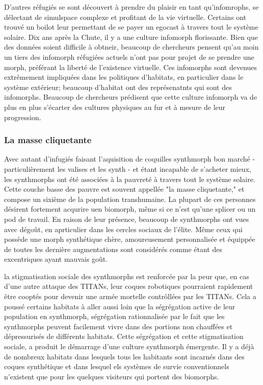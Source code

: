                D'autres réfugiés se sont découvert à prendre du plaisir en tant qu'infomrophs, se délectant de simulspace complexe et profitant de la vie virtuelle. Certains ont trouvé un boilot leur permettant de se payer un egocast à travers tout le système solaire. Dix ans après la Chute, il y a une culture infomorph florissante. Bien que des données soient difficile à obtneir, beaucoup de chercheurs pensent qu'au moin un tiers des infomorph réfugiées actuels n'ont pas pour projet de se prendre une morph, préférant la liberté de l'existence virtuelle. Ces infomorphs sont devenues extrêmement impliquées dans les politiques d'habitats, en particulier dans le système extérieur; beaucoup d'habitat ont des représenatnts qui sont des infomorphs. Beaucoup de chercheurs prédisent que cette culture infomorph va de plus en plus s'écarter des cultures physiques au fur et à mesure de leur progression. 

               \subsubsection{La masse cliquetante} \label{sec:clanking-masses} 

               Avec autant d'infugiés faisant l'aquisition de coquilles synthmorph bon marché - particulièrement les valises et les synth - et étant incapable de s'acheter mieux, les synthmorphs ont été associées à la pauvreté à travers tout le système solaire. Cette couche basse des pauvre est souvent appellée "la masse cliquetante," et compose un sixième de la population transhumaine. La plupart de ces personnes désirent fortement acqurire uen biomorph, même si ce n'est qu'une splicer ou un pod de travail. En raison de leur présence, beaucoup de synthmorphs ont vues avec dégoût, en aprticulier dans les cercles sociaux de l'élite. Même ceux qui possède une morph synthétique chère, amoureusement personnalisée et équippée de toutes les dernière augmentations sont considérés comme étant des excentriques ayant mauvais goût. 

               la stigmatisation sociale des synthmorphs est renforcée par la peur que, en cas d'une autre attaque des TITANs, leur coques robotiques pourraient rapidement être cooptés pour devenir une armée mortelle contrôllées par les TITANs. Cela a poussé certains habitats à aller aussi loin que la ségrégation active de leur population en synthmorph, ségrégation rationnalisée par le fait que les synthmorphs peuvent facilement vivre dans des portions non chauffées et dépressurisés de différents habitats. Cette ségrégation et cette stigmatisation sociale, a produit le démarrage d'une culture synthmorph émergente. Il y a déjà de nombreux habitats dans lesquels tous les habitants sont incarnés dans des coques synthétique et dans lesquel els systèmes de survie conventionnels n'existent que pour les quelques visiteurs qui portent des biomorphs. 

